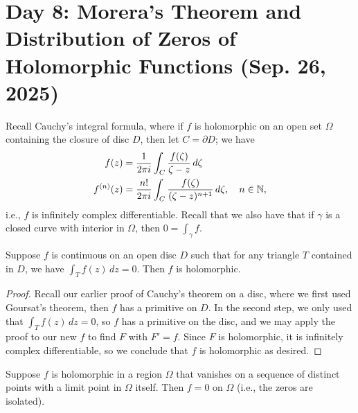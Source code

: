 \section{Day 8: Morera's Theorem and Distribution of Zeros of Holomorphic Functions (Sep. 26, 2025)}
Recall Cauchy's integral formula, where if $f$ is holomorphic on an open set $\Omega$ containing the closure of disc $D$, then let $C = \partial D$; we have
\begin{align*}
    f(z) &= \frac{1}{2\pi i} \int_C \frac{f(\zeta)}{\zeta - z} \, d\zeta \\
    f^{(n)}(z) &= \frac{n!}{2 \pi i} \int_C \frac{f(\zeta)}{(\zeta - z)^{n+1}} \, d\zeta, \quad n \in \mathbb N,
\end{align*}
i.e., $f$ is infinitely complex differentiable. Recall that we also have that if $\gamma$ is a closed curve with interior in $\Omega$, then $0 = \int_\gamma f$.
\begin{theorem}
    Suppose $f$ is continuous on an open disc $D$ such that for any triangle $T$ contained in $D$, we have $\int_T f(z) \, dz = 0$. Then $f$ is holomorphic.
\end{theorem}
\begin{proof}
    Recall our earlier proof of Cauchy's theorem on a disc, where we first used Goursat's theorem, then $f$ has a primitive on $D$. In the second step, we only used that $\int_T f(z) \, dz = 0$, so $f$ has a primitive on the disc, and we may apply the proof to our new $f$ to find $F$ with $F' = f$. Since $F$ is holomorphic, it is infinitely complex differentiable, so we conclude that $f$ is holomorphic as desired.
\end{proof}
\begin{theorem}
    Suppose $f$ is holomorphic in a region $\Omega$ that vanishes on a sequence of distinct points with a limit point in $\Omega$ itself. Then $f = 0$ on $\Omega$ (i.e., the zeros are isolated).
\end{theorem}
